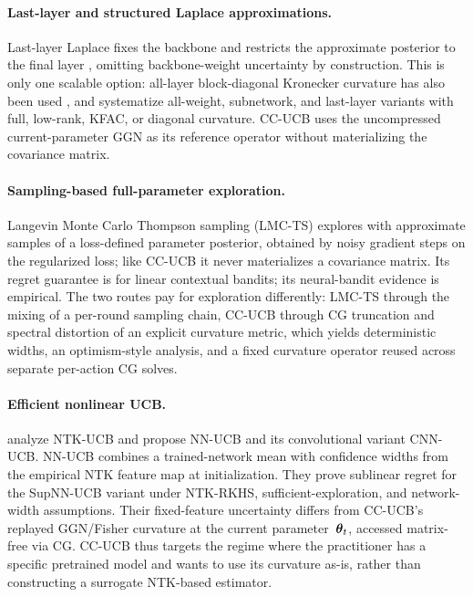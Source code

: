 \documentclass[twoside]{article}
\begin{document}
\paragraph{Last-layer and structured Laplace approximations.}
Last-layer Laplace fixes the backbone and restricts the approximate posterior
to the final layer \citep{kristiadi2020being}, omitting backbone-weight
uncertainty by construction.  This is only one scalable option: all-layer
block-diagonal Kronecker curvature has also been used
\citep{ritter2018scalable}, and \citet{daxberger2021laplace} systematize
all-weight, subnetwork, and last-layer variants with full, low-rank, KFAC, or
diagonal curvature.  CC-UCB uses the uncompressed current-parameter GGN as its
reference operator without materializing the covariance matrix.

\paragraph{Sampling-based full-parameter exploration.}
Langevin Monte Carlo Thompson sampling (LMC-TS) \citep{xu2022langevin}
explores with approximate samples of a loss-defined parameter posterior,
obtained by noisy gradient steps on the regularized loss; like CC-UCB it never
materializes a covariance matrix.  Its regret guarantee is for linear
contextual bandits; its neural-bandit evidence is empirical.
The two routes pay for exploration differently: LMC-TS through the
mixing of a per-round sampling chain, CC-UCB through CG truncation and
spectral distortion of an explicit curvature metric, which yields
deterministic widths, an optimism-style analysis, and a fixed curvature operator
reused across separate per-action CG solves.
\paragraph{Efficient nonlinear UCB.}
\citet{kassraie2022neural} analyze NTK-UCB and propose NN-UCB and its
convolutional variant CNN-UCB.  NN-UCB combines a trained-network mean with
confidence widths from the empirical NTK feature map at initialization.
They prove sublinear regret for the SupNN-UCB variant under NTK-RKHS,
sufficient-exploration, and network-width assumptions.  Their fixed-feature
uncertainty differs from CC-UCB's replayed GGN/Fisher curvature at the current
parameter~$\boldsymbol{\theta}_t$, accessed matrix-free via CG.
CC-UCB thus targets the regime where the practitioner has a specific
pretrained model and wants to use its curvature as-is, rather than
constructing a surrogate NTK-based estimator.
\end{document}
